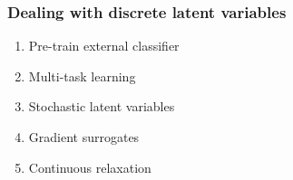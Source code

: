
\begin{frame}%
\frametitle{Dealing with discrete latent variables}%

\begin{center}
\begin{enumerate}
\item Pre-train external classifier
\item Multi-task learning
\item \alert<2->{Stochastic latent variables} 
\item \alert<2->{Gradient surrogates} 
\item \alert<2->{Continuous relaxation} 
\end{enumerate}
\end{center}

\end{frame}

%
%
%




